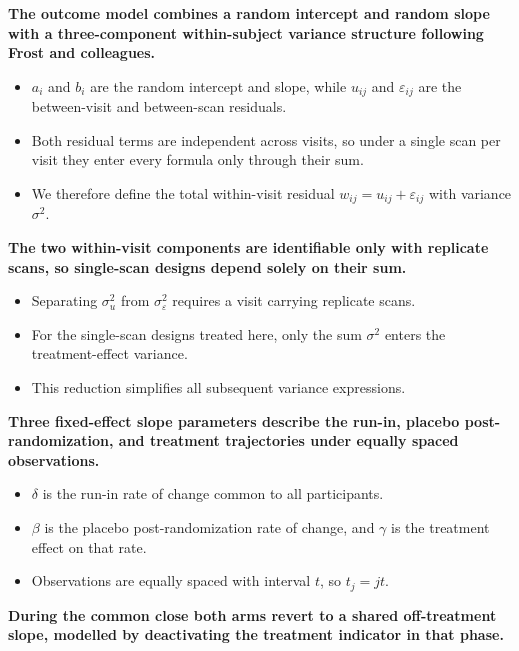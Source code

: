 \documentclass[
  11pt,
]{article}
\begin{document}
\textbf{The outcome model combines a random intercept and random slope with a three-component within-subject variance structure following Frost and colleagues.}

\begin{itemize}\setlength{\itemsep}{2pt}\setlength{\parskip}{0pt}
\item $a_i$ and $b_i$ are the random intercept and slope, while $u_{ij}$ and $\varepsilon_{ij}$ are the between-visit and between-scan residuals.
\item Both residual terms are independent across visits, so under a single scan per visit they enter every formula only through their sum.
\item We therefore define the total within-visit residual $w_{ij} = u_{ij} + \varepsilon_{ij}$ with variance $\sigma^2$.
\end{itemize}

\textbf{The two within-visit components are identifiable only with replicate scans, so single-scan designs depend solely on their sum.}

\begin{itemize}\setlength{\itemsep}{2pt}\setlength{\parskip}{0pt}
\item Separating $\sigma_u^2$ from $\sigma_\varepsilon^2$ requires a visit carrying replicate scans.
\item For the single-scan designs treated here, only the sum $\sigma^2$ enters the treatment-effect variance.
\item This reduction simplifies all subsequent variance expressions.
\end{itemize}

\textbf{Three fixed-effect slope parameters describe the run-in, placebo post-randomization, and treatment trajectories under equally spaced observations.}

\begin{itemize}\setlength{\itemsep}{2pt}\setlength{\parskip}{0pt}
\item $\delta$ is the run-in rate of change common to all participants.
\item $\beta$ is the placebo post-randomization rate of change, and $\gamma$ is the treatment effect on that rate.
\item Observations are equally spaced with interval $t$, so $t_j = jt$.
\end{itemize}

\textbf{During the common close both arms revert to a shared off-treatment slope, modelled by deactivating the treatment indicator in that phase.}
\end{document}
